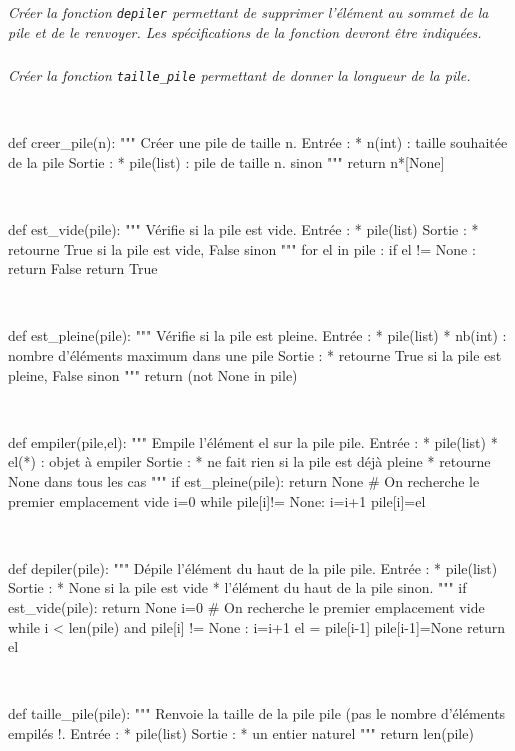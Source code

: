 \subparagraph{}\textit{Créer la fonction \texttt{depiler} permettant de supprimer l'élément au sommet de la pile et de le renvoyer. Les spécifications de la fonction devront être indiquées.}

\subparagraph{}\textit{Créer la fonction \texttt{taille\_pile} permettant de donner la longueur de la pile.}

\fi

\ifprof

\begin{corrige}

\question\
\begin{python}
def creer_pile(n):
    """
    Créer une pile de taille n.
    Entrée : 
     * n(int) : taille souhaitée de la pile
    Sortie : 
     * pile(list) : pile de taille n.
     sinon
    """
    return n*[None]
\end{python}

\question\
\begin{python}
def est_vide(pile):
    """
    Vérifie si la pile est vide.
    Entrée : 
     * pile(list)
    Sortie : 
     * retourne True si la pile est vide, False 
     sinon
    """
    for el in pile :
        if el != None :
            return False
    return True
\end{python}


\question\
\begin{python}
def est_pleine(pile):
    """
    Vérifie si la pile est pleine.
    Entrée : 
     * pile(list)
     * nb(int) : nombre d'éléments maximum dans une pile
    Sortie : 
     * retourne True si la pile est pleine, False 
     sinon
    """
    return (not None in pile) 
\end{python}

\question\
\begin{python}
def empiler(pile,el):
    """
    Empile l'élément el sur la pile pile.
    Entrée : 
     * pile(list)
     * el(*) : objet à empiler
    Sortie :
     * ne fait rien si la pile est déjà pleine
     * retourne None dans tous les cas
    """
    if est_pleine(pile):
        return None
    # On recherche le premier emplacement vide
    i=0
    while pile[i]!= None:
        i=i+1
    pile[i]=el
\end{python}

\question\
\begin{python}
def depiler(pile):
    """
    Dépile l'élément du haut de la pile pile.
    Entrée :
     * pile(list)
    Sortie :
     * None si la pile est vide
     * l'élément du haut de la pile sinon.
     """
    if est_vide(pile):
        return None
    i=0
    # On recherche le premier emplacement vide
    while i < len(pile) and pile[i] != None :
        i=i+1
    el = pile[i-1]
    pile[i-1]=None
    return el   
\end{python}

\question\
\begin{python}
def taille_pile(pile):
    """
    Renvoie la taille de la pile pile (pas le nombre d'éléments empilés !.
    Entrée :
     * pile(list)
    Sortie :
     * un entier naturel
    """
    return len(pile)
\end{python}
 
\setcounter{question}{0}
\end{corrige}
